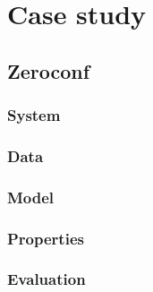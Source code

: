 \chapter{Case study}

\section{Zeroconf}
\subsection{System}
\subsection{Data}
\subsection{Model}
\subsection{Properties}
\subsection{Evaluation}

